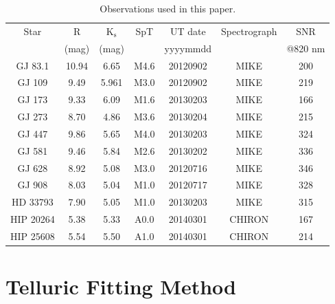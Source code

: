 \begin{table}
  \centering
  \caption{Observations used in this paper. }
  \begin{tabular}{|ccccccc|}
  \hline
    Star &    R   &  $\mathrm{K_s}$ & SpT  & UT date  & Spectrograph & SNR    \\
         &  (mag) & (mag)      &      & yyyymmdd &              & @820 nm \\ 
    \hline \hline
    
    GJ 83.1  &  10.94  &  6.65  &  M4.6  &  20120902  &  MIKE  &  200  \\
    GJ 109 &  9.49  &   5.961   & M3.0 & 20120902 & MIKE        & 219 \\
    GJ 173  &  9.33  &  6.09  &  M1.6  &  20130203  &  MIKE  &  166 \\
    GJ 273  &  8.70  &  4.86  &  M3.6  &  20130204  &  MIKE  &  215\\
    GJ 447  &  9.86  &  5.65  &  M4.0  &  20130203  &  MIKE  &  324 \\
    GJ 581  &  9.46  &  5.84  &  M2.6  &  20130202  &  MIKE  &  336 \\
    GJ 628 &  8.92  &  5.08  &  M3.0  &  20120716  &  MIKE  &  346 \\
    GJ 908  &  8.03  &  5.04  &  M1.0  &  20120717  &  MIKE  &  328 \\
    HD 33793  &  7.90  &  5.05  &  M1.0  & 20130203  &  MIKE  &  315 \\
    HIP 20264  &  5.38  &  5.33 &  A0.0  &  20140301  &  CHIRON  &  167 \\
    HIP 25608  &  5.54  &  5.50  &  A1.0  &  20140301  & CHIRON  &  214 \\
    \hline
  
  \end{tabular}
  \label{tab:sample}

\end{table}



\section{Telluric Fitting Method}
\label{sec:tellcorr}


